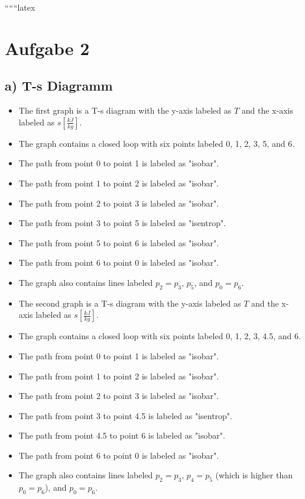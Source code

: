 
``````latex


\section*{Aufgabe 2}
\subsection*{a) T-s Diagramm}

\begin{itemize}
    \item The first graph is a T-s diagram with the y-axis labeled as \( T \) and the x-axis labeled as \( s \left[ \frac{kJ}{kg} \right] \). 
    \item The graph contains a closed loop with six points labeled 0, 1, 2, 3, 5, and 6.
    \item The path from point 0 to point 1 is labeled as "isobar".
    \item The path from point 1 to point 2 is labeled as "isobar".
    \item The path from point 2 to point 3 is labeled as "isobar".
    \item The path from point 3 to point 5 is labeled as "isentrop".
    \item The path from point 5 to point 6 is labeled as "isobar".
    \item The path from point 6 to point 0 is labeled as "isobar".
    \item The graph also contains lines labeled \( p_2 = p_3 \), \( p_5 \), and \( p_0 = p_6 \).
\end{itemize}

\begin{itemize}
    \item The second graph is a T-s diagram with the y-axis labeled as \( T \) and the x-axis labeled as \( s \left[ \frac{kJ}{kg} \right] \). 
    \item The graph contains a closed loop with six points labeled 0, 1, 2, 3, 4.5, and 6.
    \item The path from point 0 to point 1 is labeled as "isobar".
    \item The path from point 1 to point 2 is labeled as "isobar".
    \item The path from point 2 to point 3 is labeled as "isobar".
    \item The path from point 3 to point 4.5 is labeled as "isentrop".
    \item The path from point 4.5 to point 6 is labeled as "isobar".
    \item The path from point 6 to point 0 is labeled as "isobar".
    \item The graph also contains lines labeled \( p_2 = p_3 \), \( p_4 = p_5 \) (which is higher than \( p_0 = p_6 \)), and \( p_0 = p_6 \).
\end{itemize}

